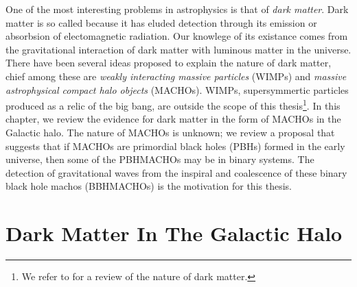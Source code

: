 
One of the most interesting problems in astrophysics is that of \emph{dark
matter}. Dark matter is so called because it has eluded detection through its
emission or absorbsion of electomagnetic radiation. Our knowlege of its
existance comes from the gravitational interaction of dark matter with
luminous matter in the universe. There have been several ideas proposed to
explain the nature of dark matter, chief among these are \emph{weakly
interacting massive particles} (WIMPs) and \emph{massive astrophysical
compact halo objects} (MACHOs)\cite{Griest:1990vu}.  WIMPs, supersymmertic
particles produced as a relic of the big bang, are outside the scope of this
thesis\footnote{We refer to \cite{Griest:1995gs} for a review of the nature of
dark matter.}. In this chapter, we review the evidence for dark matter in the
form of MACHOs in the Galactic halo. The nature of MACHOs is unknown; we
review a proposal that suggests that if MACHOs are primordial black holes
(PBHs) formed in the early universe, then some of the PBHMACHOs may be in
binary systems\cite{Nakamura:1997sm}. The detection of gravitational waves
from the inspiral and coalescence of these binary black hole machos
(BBHMACHOs) is the motivation for this thesis.

\section{Dark Matter In The Galactic Halo}
\label{s:darkmatter}

